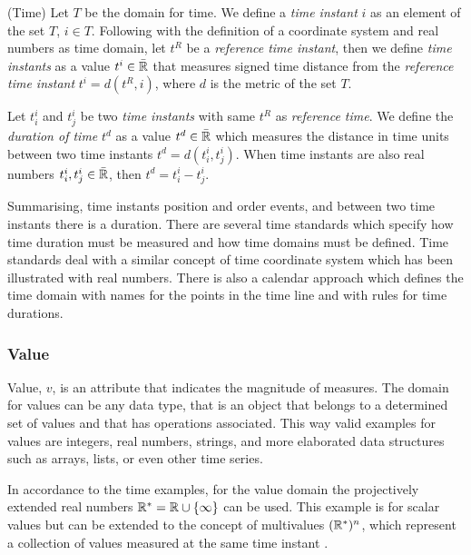 \begin{definition}(Time)
  \label{def:model:temps}
  Let $T$ be the domain for time. We define a \emph{time instant} $i$
  as an element of the set $T$, $i \in T$. Following with the
  definition of a coordinate system and real numbers as time domain,
  let $t^{R}$ be a \emph{reference time instant}, then we define
  \emph{time instants} as a value $t^i \in\bar{\mathbb{R}}$ that measures signed
  time distance from the \emph{reference time instant} $t^i=
  d(t^{R},i)$, where $d$ is the metric of the set $T$.

  Let $t^i_i$ and $t^i_j$ be two \emph{time instants} with same $t^R$
  as \emph{reference time}. We define the \emph{duration of time}
  $t^d$ as a value $t^d \in\bar{\mathbb{R}}$ which measures the distance in time
  units between two time instants $t^d = d(t^i_i,t^i_j)$. When time
  instants are also real numbers $t^i_i , t^i_j \in \bar{\mathbb{R}}$, then $t^d =
  t^i_i - t^i_j$.
\end{definition}

Summarising, time instants position and order events, and between two
time instants there is a duration.  There are several time standards
\cite{allen:timescales} which specify how time duration must be
measured and how time domains must be defined.  Time standards deal
with a similar concept of time coordinate system which has been
illustrated with real numbers. There is also a calendar approach which
defines the time domain with names for the points in the time line and
with rules for time durations.


\subsubsection{Value}

Value, $v$, is an attribute that indicates the magnitude of measures. The
domain for values can be any data type, that is an object that belongs
to a determined set of values and that has operations associated.
This way valid examples for values are integers, real numbers,
strings, and more elaborated data structures such as arrays, lists, or
even other time series.

In accordance to the time examples, for the value domain the
projectively extended real numbers $\mathbb{R}^{*} = \mathbb{R} \cup \{\infty\}$ can be
used.  This example is for scalar values but can be extended to the
concept of multivalues $(\mathbb{R}^{*})^n$, which represent a collection of values
measured at the same time instant \cite{assfalg08:thesis}.




